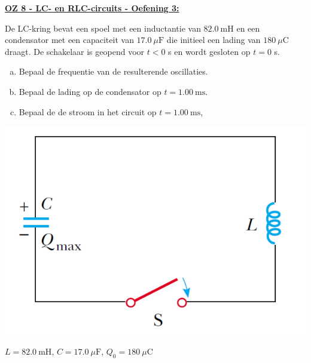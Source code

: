 \textbf{\underline{OZ 8 - LC- en  RLC-circuits - Oefening 3:}}
\vspace{0.5cm}

De LC-kring bevat een spoel met een inductantie van $82.0 \ \text{mH}$ en een condensator met een capaciteit van $17.0 \ \mu \text{F}$ die initieel een lading van $180 \ \mu \text{C}$ draagt. De schakelaar is geopend voor $t<0$ s en wordt gesloten op $t=0$ s.

\begin{minipage}{.66\textwidth}
    \vspace{-0.3cm}\begin{enumerate}[(a)]
        \item Bepaal de frequentie van de resulterende oscillaties.
        \item Bepaal de lading op de condensator op $t = 1.00 \ \text{ms}$.
        \item Bepaal de de stroom in het circuit op $t = 1.00 \ \text{ms}$,
    \end{enumerate}
\end{minipage}
\begin{minipage}{.3\textwidth}
    \includegraphics[scale = 0.275]{oz08/resources/Oz8Oef3.png}
\end{minipage}


\begin{description}[labelwidth=1.5cm, leftmargin=!]
    \item[Geg. :]   $L = 82.0 \ \text{mH}$, $C = 17.0 \ \mu \text{F}$, $Q_0 = 180 \ \mu \text{C}$
\end{description}

